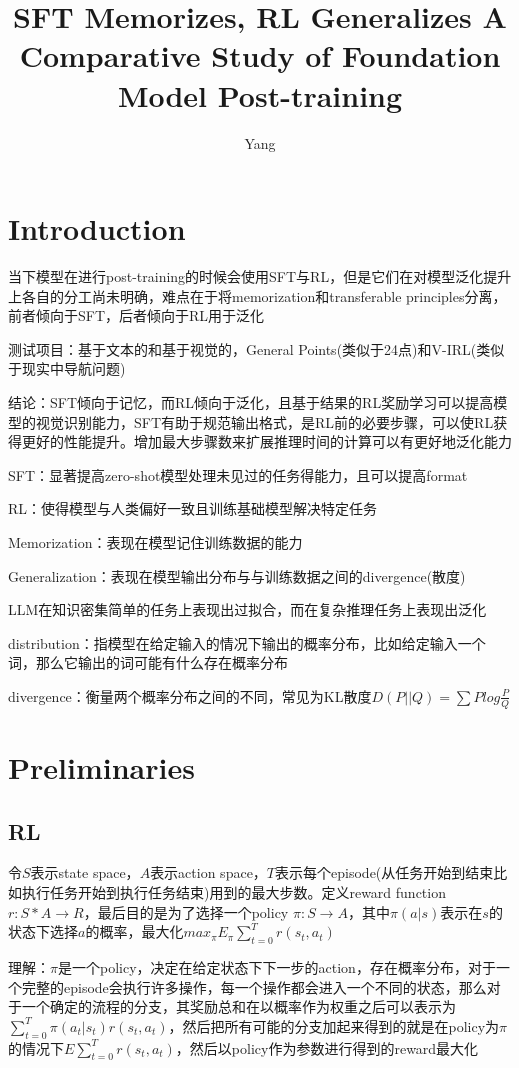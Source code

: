 \documentclass[a4paper,12pt]{article}
\title{SFT Memorizes, RL Generalizes A Comparative Study of Foundation Model Post-training}
\author{Yang}
\begin{document}
\maketitle

\section{Introduction}
当下模型在进行post-training的时候会使用SFT与RL，但是它们在对模型泛化提升上各自的分工尚未明确，难点在于将memorization和transferable principles分离，前者倾向于SFT，后者倾向于RL用于泛化

测试项目：基于文本的和基于视觉的，General Points(类似于24点)和V-IRL(类似于现实中导航问题)

结论：SFT倾向于记忆，而RL倾向于泛化，且基于结果的RL奖励学习可以提高模型的视觉识别能力，SFT有助于规范输出格式，是RL前的必要步骤，可以使RL获得更好的性能提升。增加最大步骤数来扩展推理时间的计算可以有更好地泛化能力

SFT：显著提高zero-shot模型处理未见过的任务得能力，且可以提高format

RL：使得模型与人类偏好一致且训练基础模型解决特定任务

Memorization：表现在模型记住训练数据的能力

Generalization：表现在模型输出分布与与训练数据之间的divergence(散度)

LLM在知识密集简单的任务上表现出过拟合，而在复杂推理任务上表现出泛化

distribution：指模型在给定输入的情况下输出的概率分布，比如给定输入一个词，那么它输出的词可能有什么存在概率分布

divergence：衡量两个概率分布之间的不同，常见为KL散度$D(P||Q) = \sum Plog\frac{P}{Q}$

\section{Preliminaries}
\subsection{RL}
令$S$表示state space，$A$表示action space，$T$表示每个episode(从任务开始到结束比如执行任务开始到执行任务结束)用到的最大步数。定义reward function $r: S*A \to R$，最后目的是为了选择一个policy $\pi: S \to A$，其中$\pi(a|s)$表示在$s$的状态下选择$a$的概率，最大化$max_{\pi}E_{\pi}\sum_{t=0}^{T}r(s_t, a_t)$

理解：$\pi$是一个policy，决定在给定状态下下一步的action，存在概率分布，对于一个完整的episode会执行许多操作，每一个操作都会进入一个不同的状态，那么对于一个确定的流程的分支，其奖励总和在以概率作为权重之后可以表示为$\sum_{t=0}^{T}\pi(a_t|s_t)r(s_t, a_t)$，然后把所有可能的分支加起来得到的就是在policy为$\pi$的情况下$E\sum_{t=0}^{T}r(s_t, a_t)$，然后以policy作为参数进行得到的reward最大化
\end{document}
